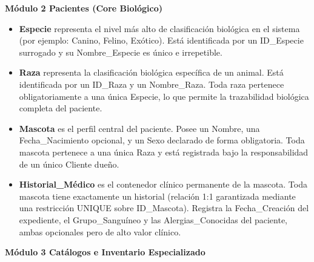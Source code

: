 \vspace{0.5cm}
\noindent \textbf{Módulo 2 Pacientes (Core Biológico)}

\begin{itemize}
	\item \textbf{Especie} representa el nivel más alto de clasificación biológica en el sistema (por ejemplo: Canino, Felino, Exótico). Está identificada por un ID\_Especie surrogado y su Nombre\_Especie es único e irrepetible.
	\item \textbf{Raza} representa la clasificación biológica específica de un animal. Está identificada por un ID\_Raza y un Nombre\_Raza. Toda raza pertenece obligatoriamente a una única Especie, lo que permite la trazabilidad biológica completa del paciente.
	\item \textbf{Mascota} es el perfil central del paciente. Posee un Nombre, una Fecha\_Nacimiento opcional, y un Sexo declarado de forma obligatoria. Toda mascota pertenece a una única Raza y está registrada bajo la responsabilidad de un único Cliente dueño.
	\item \textbf{Historial\_Médico} es el contenedor clínico permanente de la mascota. Toda mascota tiene exactamente un historial (relación 1:1 garantizada mediante una restricción UNIQUE sobre ID\_Mascota). Registra la Fecha\_Creación del expediente, el Grupo\_Sanguíneo y las Alergias\_Conocidas del paciente, ambas opcionales pero de alto valor clínico.
\end{itemize}

\vspace{0.5cm}
\noindent \textbf{Módulo 3 Catálogos e Inventario Especializado}

